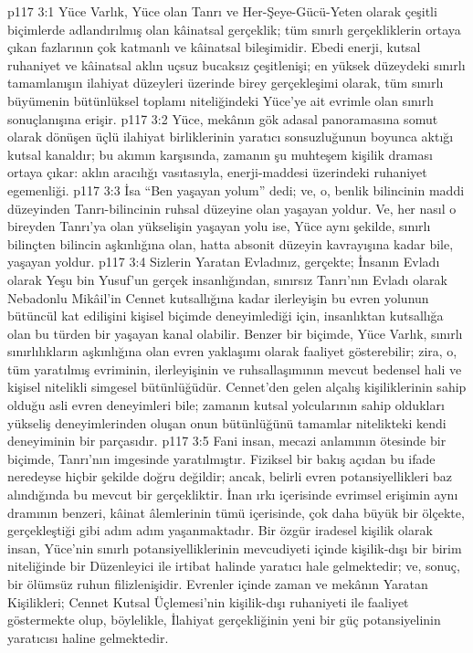 \vs p117 3:1 Yüce Varlık, Yüce olan Tanrı ve Her\hyp{}Şeye\hyp{}Gücü\hyp{}Yeten olarak çeşitli biçimlerde adlandırılmış olan kâinatsal gerçeklik; tüm sınırlı gerçekliklerin ortaya çıkan fazlarının çok katmanlı ve kâinatsal bileşimidir. Ebedi enerji, kutsal ruhaniyet ve kâinatsal aklın uçsuz bucaksız çeşitlenişi; en yüksek düzeydeki sınırlı tamamlanışın ilahiyat düzeyleri üzerinde birey gerçekleşimi olarak, tüm sınırlı büyümenin bütünlüksel toplamı niteliğindeki Yüce’ye ait evrimle olan sınırlı sonuçlanışına erişir.
\vs p117 3:2 Yüce, mekânın gök adasal panoramasına somut olarak dönüşen üçlü ilahiyat birliklerinin yaratıcı sonsuzluğunun boyunca aktığı kutsal kanaldır; bu akımın karşısında, zamanın şu muhteşem kişilik draması ortaya çıkar: aklın aracılığı vasıtasıyla, enerji\hyp{}maddesi üzerindeki ruhaniyet egemenliği.
\vs p117 3:3  İsa “Ben yaşayan yolum” dedi; ve, o, benlik bilincinin maddi düzeyinden Tanrı\hyp{}bilincinin ruhsal düzeyine olan yaşayan yoldur. Ve, her nasıl o bireyden Tanrı’ya olan yükselişin yaşayan yolu ise, Yüce aynı şekilde, sınırlı bilinçten bilincin aşkınlığına olan, hatta absonit düzeyin kavrayışına kadar bile, yaşayan yoldur.
\vs p117 3:4 Sizlerin Yaratan Evladınız, gerçekte; İnsanın Evladı olarak Yeşu bin Yusuf’un gerçek insanlığından, sınırsız Tanrı’nın Evladı olarak Nebadonlu Mikâil’in Cennet kutsallığına kadar ilerleyişin bu evren yolunun bütüncül kat edilişini kişisel biçimde deneyimlediği için, insanlıktan kutsallığa olan bu türden bir yaşayan kanal olabilir. Benzer bir biçimde, Yüce Varlık, sınırlı sınırlılıkların aşkınlığına olan evren yaklaşımı olarak faaliyet gösterebilir; zira, o, tüm yaratılmış evriminin, ilerleyişinin ve ruhsallaşımının mevcut bedensel hali ve kişisel nitelikli simgesel bütünlüğüdür. Cennet’den gelen alçalış kişiliklerinin sahip olduğu asli evren deneyimleri bile; zamanın kutsal yolcularının sahip oldukları yükseliş deneyimlerinden oluşan onun bütünlüğünü tamamlar nitelikteki kendi deneyiminin bir parçasıdır.
\vs p117 3:5 Fani insan, mecazi anlamının ötesinde bir biçimde, Tanrı’nın imgesinde yaratılmıştır. Fiziksel bir bakış açıdan bu ifade neredeyse hiçbir şekilde doğru değildir; ancak, belirli evren potansiyellikleri baz alındığında bu mevcut bir gerçekliktir. İnan ırkı içerisinde evrimsel erişimin aynı dramının benzeri, kâinat âlemlerinin tümü içerisinde, çok daha büyük bir ölçekte, gerçekleştiği gibi adım adım yaşanmaktadır. Bir özgür iradesel kişilik olarak insan, Yüce’nin sınırlı potansiyelliklerinin mevcudiyeti içinde kişilik\hyp{}dışı bir birim niteliğinde bir Düzenleyici ile irtibat halinde yaratıcı hale gelmektedir; ve, sonuç, bir ölümsüz ruhun filizlenişidir. Evrenler içinde zaman ve mekânın Yaratan Kişilikleri; Cennet Kutsal Üçlemesi’nin kişilik\hyp{}dışı ruhaniyeti ile faaliyet göstermekte olup, böylelikle, İlahiyat gerçekliğinin yeni bir güç potansiyelinin yaratıcısı haline gelmektedir.

